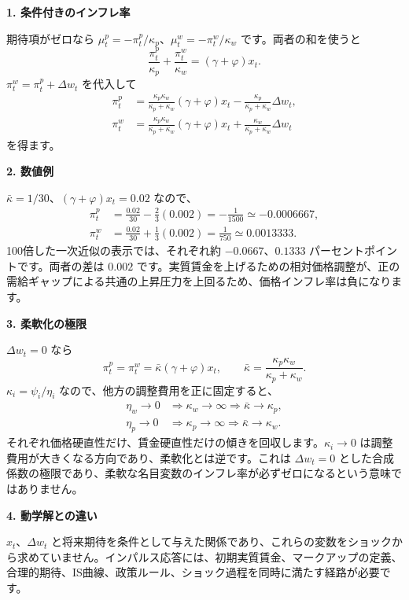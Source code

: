 \documentclass[
  japanese,
  lualatex,
  ja=standard,
  11pt,
  a4paper]{ltjsarticle}
\begin{document}
\textbf{1. 条件付きのインフレ率}

期待項がゼロなら
\(\mu_t^p=-\pi_t^p/\kappa_p\)、\(\mu_t^w=-\pi_t^w/\kappa_w\)
です。両者の和を使うと \[
\frac{\pi_t^p}{\kappa_p}+\frac{\pi_t^w}{\kappa_w}
=(\gamma+\varphi)x_t.
\] \(\pi_t^w=\pi_t^p+\Delta w_t\) を代入して \[
\begin{aligned}
\pi_t^p&=\frac{\kappa_p\kappa_w}{\kappa_p+\kappa_w}
(\gamma+\varphi)x_t-\frac{\kappa_p}{\kappa_p+\kappa_w}\Delta w_t,\\
\pi_t^w&=\frac{\kappa_p\kappa_w}{\kappa_p+\kappa_w}
(\gamma+\varphi)x_t+\frac{\kappa_w}{\kappa_p+\kappa_w}\Delta w_t
\end{aligned}
\] を得ます。

\textbf{2. 数値例}

\(\bar\kappa=1/30\)、\((\gamma+\varphi)x_t=0.02\) なので、 \[
\begin{aligned}
\pi_t^p&=\frac{0.02}{30}-\frac23(0.002)
=-\frac1{1500}\simeq-0.0006667,\\
\pi_t^w&=\frac{0.02}{30}+\frac13(0.002)
=\frac1{750}\simeq0.0013333.
\end{aligned}
\] 100倍した一次近似の表示では、それぞれ約 \(-0.0667\)、\(0.1333\)
パーセントポイントです。両者の差は \(0.002\)
です。実質賃金を上げるための相対価格調整が、正の需給ギャップによる共通の上昇圧力を上回るため、価格インフレ率は負になります。

\textbf{3. 柔軟化の極限}

\(\Delta w_t=0\) なら \[
\pi_t^p=\pi_t^w=\bar\kappa(\gamma+\varphi)x_t,
\qquad
\bar\kappa=\frac{\kappa_p\kappa_w}{\kappa_p+\kappa_w}.
\] \(\kappa_i=\psi_i/\eta_i\) なので、他方の調整費用を正に固定すると、
\[
\begin{aligned}
\eta_w\to0&\Rightarrow\kappa_w\to\infty
\Rightarrow\bar\kappa\to\kappa_p,\\
\eta_p\to0&\Rightarrow\kappa_p\to\infty
\Rightarrow\bar\kappa\to\kappa_w.
\end{aligned}
\]
それぞれ価格硬直性だけ、賃金硬直性だけの傾きを回収します。\(\kappa_i\to0\)
は調整費用が大きくなる方向であり、柔軟化とは逆です。これは
\(\Delta w_t=0\)
とした合成係数の極限であり、柔軟な名目変数のインフレ率が必ずゼロになるという意味ではありません。


\textbf{4. 動学解との違い}

\(x_t\)、\(\Delta w_t\)
と将来期待を条件として与えた関係であり、これらの変数をショックから求めていません。インパルス応答には、初期実質賃金、マークアップの定義、合理的期待、IS曲線、政策ルール、ショック過程を同時に満たす経路が必要です。
\end{document}
